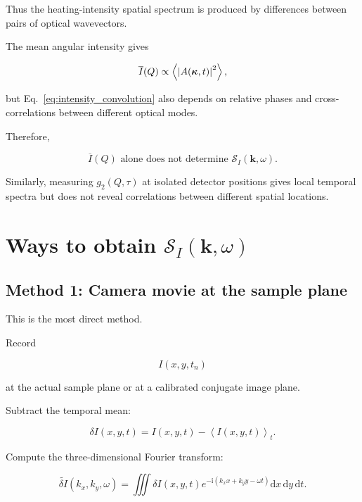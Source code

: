 \documentclass[11pt]{article}
\newcommand{\avg}[1]{\left\langle #1 \right\rangle}
\renewcommand{\dd}{\mathrm{d}}
\newcommand{\ii}{\mathrm{i}}
\newcommand{\SII}{\mathcal{S}_{I}}
\newcommand{\kvec}{\mathbf{k}}
\begin{document}
Thus the heating-intensity spatial spectrum is produced by differences
between pairs of optical wavevectors.

The mean angular intensity gives

\begin{equation}
    \overline{I}(Q)
    \propto
    \avg{\abs{A(\bm{\kappa},t)}^2},
\end{equation}

but Eq.~\eqref{eq:intensity_convolution} also depends on relative phases and
cross-correlations between different optical modes.

Therefore,

\begin{equation}
\boxed{
    \overline{I}(Q)
    \text{ alone does not determine }
    \SII(\kvec,\omega).
}
\end{equation}

Similarly, measuring $g_2(Q,\tau)$ at isolated detector positions gives local
temporal spectra but does not reveal correlations between different spatial
locations.

\section{Ways to obtain \texorpdfstring{$\SII(\kvec,\omega)$}{S(k,omega)}}

\subsection{Method 1: Camera movie at the sample plane}

This is the most direct method.

Record

\begin{equation}
    I(x,y,t_n)
\end{equation}

at the actual sample plane or at a calibrated conjugate image plane.

Subtract the temporal mean:

\begin{equation}
    \delta I(x,y,t)
    =
    I(x,y,t)
    -
    \avg{I(x,y,t)}_t.
\end{equation}

Compute the three-dimensional Fourier transform:

\begin{equation}
    \widetilde{\delta I}(k_x,k_y,\omega)
    =
    \iiint
    \delta I(x,y,t)
    e^{-\ii(k_xx+k_yy-\omega t)}
    \dd x\,\dd y\,\dd t.
\end{equation}
\end{document}
